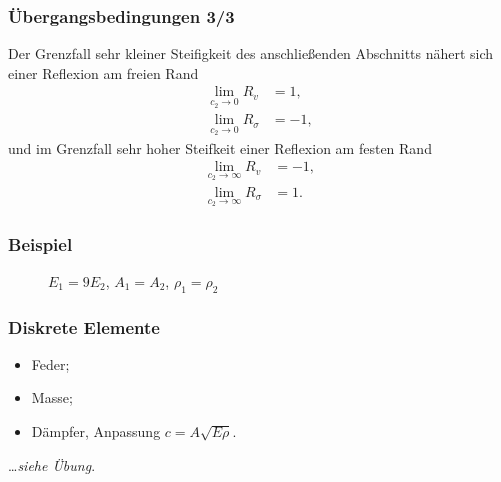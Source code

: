 \begin{frame}
 \frametitle{Übergangsbedingungen 3/3}
Der Grenzfall sehr kleiner Steifigkeit des anschließenden Abschnitts nähert sich einer Reflexion am freien Rand
\begin{align*}
 \lim_{c_2 \to 0} R_v &= 1, \\
 \lim_{c_2 \to 0} R_\sigma &= -1,
\end{align*}
und im Grenzfall sehr hoher Steifkeit einer Reflexion am festen Rand
\begin{align*}
 \lim_{c_2 \to \infty} R_v &= -1 , \\
 \lim_{c_2 \to \infty} R_\sigma &= 1.
\end{align*}
\end{frame} 

\begin{frame}
 \frametitle{Beispiel}
\begin{figure}

\hfill

\caption*{$E_1=9E_2$, $A_1=A_2$, $\rho_1=\rho_2$ \cite{Verruijt2010}}
\end{figure}
\end{frame} 


\begin{frame}
 \frametitle{Diskrete Elemente}


 \begin{itemize}
  \item Feder;
  \item Masse;
  \item Dämpfer, Anpassung $c=A\sqrt{E\rho}$.
 \end{itemize}
\hfill \dots \textsl{siehe Übung}.
\end{frame} 
